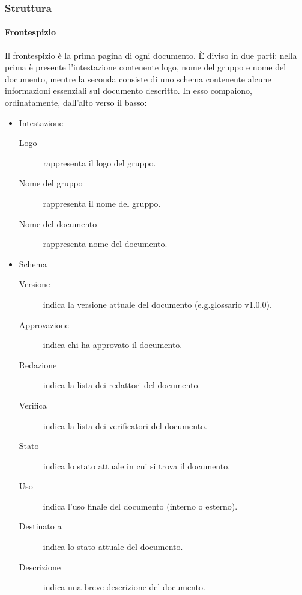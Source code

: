 \documentclass[../norme-di-progetto.tex]{subfiles}
\begin{document}
\subsubsection{Struttura}%
\label{subs:struttura}

\paragraph{Frontespizio}%
\label{par:frontespizio}
Il frontespizio è la prima pagina di ogni documento. È diviso in due parti: nella prima è presente l'intestazione contenente logo, nome del gruppo e nome del documento, mentre la seconda consiste di uno schema contenente alcune informazioni essenziali sul documento descritto. In esso compaiono, ordinatamente, dall'alto verso il basso:

\begin{itemize}
  \item Intestazione
        \begin{description}
          \item [Logo] rappresenta il logo del gruppo.
          \item [Nome del gruppo] rappresenta il nome del gruppo.
          \item [Nome del documento] rappresenta nome del documento.
        \end{description}
  \item Schema
        \begin{description}
          \item [Versione] indica la versione attuale del documento (e.g.\@ glossario v1.0.0).
          \item [Approvazione] indica chi ha approvato il documento.
          \item [Redazione] indica la lista dei redattori del documento.
          \item [Verifica] indica la lista dei verificatori del documento.
          \item [Stato] indica lo stato attuale in cui si trova il documento.
          \item [Uso] indica l'uso finale del documento (interno o esterno).
          \item [Destinato a] indica lo stato attuale del documento.
          \item [Descrizione] indica una breve descrizione del documento.
        \end{description}
\end{itemize}
\end{document}
